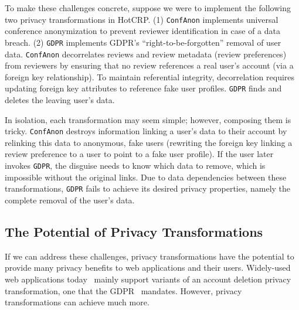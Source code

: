 %
To make these challenges concrete, suppose we were to implement the following two privacy
transformations in HotCRP. 
%
(1) \texttt{ConfAnon} implements universal conference anonymization to
prevent reviewer identification in case of a data breach.
%
(2) \texttt{GDPR} implements GDPR's ``right-to-be-forgotten'' removal of user data.
%
\texttt{ConfAnon} decorrelates reviews and review metadata (\eg review preferences) from reviewers
by ensuring that no review references a real user's account (via a foreign key relationship).
To maintain referential integrity, decorrelation requires updating foreign key
attributes to reference fake user profiles.
\texttt{GDPR} finds and deletes the leaving user's data.
%

%
In isolation, each transformation may seem simple; however, composing them is tricky.
\texttt{ConfAnon} destroys information linking a user's data to their account by relinking this data
to anonymous, fake users (\eg rewriting the foreign key linking a review preference to a user to
point to a fake user profile).  If the user later invokes \texttt{GDPR}, the
disguise needs to know which data to remove, which is impossible without the original links.
%
Due to data dependencies between these transformations, \texttt{GDPR} fails to achieve its desired
privacy properties, namely the complete removal of the user's data.
%

\subsection{The Potential of Privacy Transformations}
If we can address these challenges, privacy transformations have the potential to provide many
privacy benefits to web applications and their users.
Widely-used web applications today~\cite{spotify:privacy, amazon:privacy,
strava:privacy, hotcrp:privacy, wikipedia:privacy, facebook:privacy, twitter:privacy,
reddit:privacy, github:privacy, lobsters:privacy} mainly support variants of an account deletion privacy transformation,
one that \eg the GDPR~\cite[Art.\ 17]{eu:gdpr} mandates.
However, privacy transformations can achieve much more.

